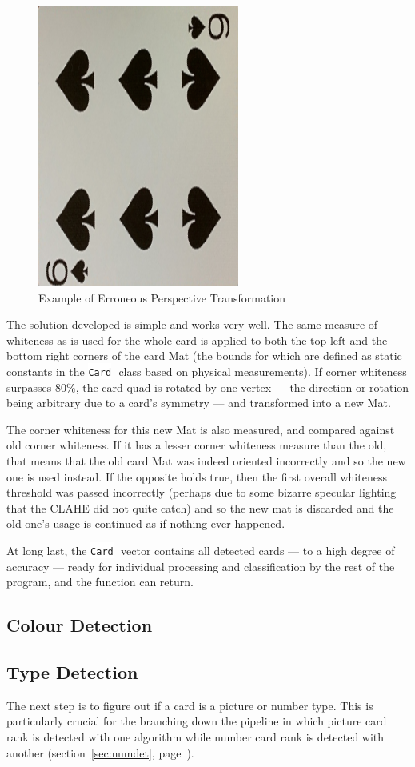 \documentclass[a4paper,12pt,notitlepage]{article}
\newcommand{\secref}[1]{(section~\ref{#1}, page~\pageref{#1})}
\newcommand{\code}[1]{\colorbox{white}{\lstinline[basicstyle=\ttfamily\color{black}]|#1|} }
\begin{document}
\begin{figure}[H]
				\includegraphics[width=0.3\linewidth]{rot4}
				\caption{Example of Erroneous Perspective Transformation}
				\label{fig:rot}
			\end{figure}

			The solution developed is simple and works very well. The same measure of whiteness as is used for the whole card is applied to both the top left and the bottom right corners of the card Mat (the bounds for which are defined as static constants in the \code{Card} class based on physical measurements). If corner whiteness surpasses 80\%, the card quad is rotated by one vertex --- the direction or rotation being arbitrary due to a card's symmetry --- and transformed into a new Mat.

			The corner whiteness for this new Mat is also measured, and compared against old corner whiteness. If it has a lesser corner whiteness measure than the old, that means that the old card Mat was indeed oriented incorrectly and so the new one is used instead. If the opposite holds true, then the first overall whiteness threshold was passed incorrectly (perhaps due to some bizarre specular lighting that the CLAHE did not quite catch) and so the new mat is discarded and the old one's usage is continued as if nothing ever happened.

			At long last, the \code{Card} vector contains all detected cards --- to a high degree of accuracy --- ready for individual processing and classification by the rest of the program, and the function can return.
	\subsection{Colour Detection}
		
	\subsection{Type Detection}
		\label{sec:typedet}
		The next step is to figure out if a card is a picture or number type. This is particularly crucial for the branching down the pipeline in which picture card rank is detected with one algorithm while number card rank is detected with another \secref{sec:numdet}.
\end{document}
